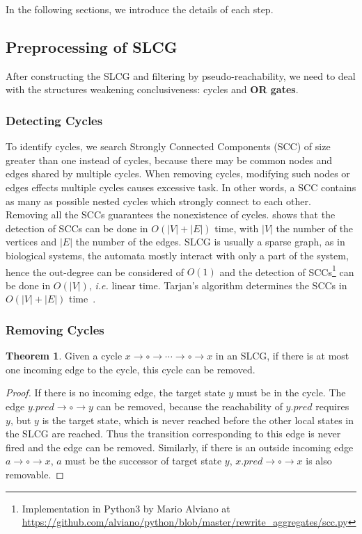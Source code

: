 \documentclass{article}
\theoremstyle{definition}
\newtheorem{theorem}{Theorem}
\newcommand{\roux}[2]{{\sout{#1}}{{\color{purple}~#2}}}
\begin{document}
In the following sections, we introduce the details of each step.

\subsection{Preprocessing of SLCG}\label{sectprecond}
After constructing the SLCG and filtering by pseudo-reachability, we need to deal with the structures weakening conclusiveness: cycles and \textbf{OR gates}.
\subsubsection{Detecting Cycles}
To identify cycles, we search Strongly Connected Components (SCC) of size greater than one instead of cycles, because there may be common nodes and edges shared by multiple cycles.
When removing cycles,  modifying such nodes or edges effects multiple cycles causes excessive task.
In other words, a SCC contains as many as possible nested cycles which strongly connect to each other.
Removing all the SCCs guarantees the nonexistence of cycles.
\cite{tarjan1972} shows that the detection of SCCs can be done in $O (|V|+|E|)$ time, with $|V|$ the number of the vertices and $|E|$ the number of the edges.
SLCG is usually a sparse graph, as in biological systems, the automata mostly interact with only a part of the system, hence the out-degree can be considered of $O (1)$ and the detection of SCCs\footnote{Implementation in Python3 by Mario Alviano at \url{https://github.com/alviano/python/blob/master/rewrite_aggregates/scc.py}} can be done in $O(|V|)$, \textit{i.e.} linear time.
Tarjan's algorithm determines the SCCs in $O(|V|+|E|)$ time~\cite{tarjan1972}. 

\subsubsection{Removing Cycles}
\begin{theorem}\label{th:break_cycle}
Given a cycle $x\to \circ \to \cdots \to \circ \to x$ in an SLCG, if there is at most one incoming edge to the cycle, this cycle can be removed.
\end{theorem}
\begin{proof}
If there is no incoming edge, the target state $y$ must be in the cycle. 
The edge $y.pred\to\circ\to y$ can be removed, because the reachability of $y.pred$ requires $y$, but $y$ is the target state, which is never reached before the other local states in the SLCG are reached.
Thus the transition corresponding to this edge is never fired and the edge can be removed.
Similarly, if there is an outside incoming edge $a\to \circ \to x$, $a$ must be the successor of target state $y$, $x.pred\to\circ\to x$ is also removable.
\end{proof}
\end{document}
